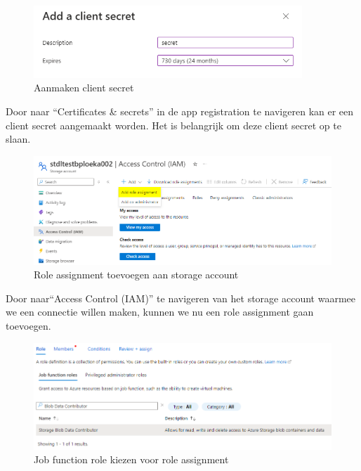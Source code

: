 \begin{figure}[H]
    \centering
    \includegraphics[width=0.9\textwidth]{./graphics/databricks/connection_3.png}
    \caption{Aanmaken client secret}
\end{figure}

Door naar ``Certificates \& secrets'' in de app registration te navigeren kan er een client secret aangemaakt worden. Het is belangrijk om deze client secret op te slaan.

\begin{figure}[H]
    \centering
    \includegraphics[width=1\textwidth]{./graphics/databricks/connection_4.png}
    \caption{Role assignment toevoegen aan storage account}
\end{figure}

Door naar``Access Control (IAM)'' te navigeren van het storage account waarmee we een connectie willen maken, kunnen we nu een role assignment gaan toevoegen.

\begin{figure}[H]
    \centering
    \includegraphics[width=1\textwidth]{./graphics/databricks/connection_5.png}
    \caption{Job function role kiezen voor role assignment}
\end{figure}

